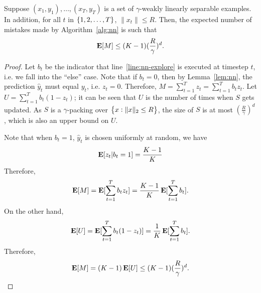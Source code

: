 \begin{theorem}
\label{thm:margin_at_upper}
Suppose $(x_1,y_1), \ldots, (x_T, y_T)$ is a set of $\gamma$-weakly linearly
separable examples. In addition, for all $t$ in $\cbr{1,2,\dots,T}$, $\| x_t \|
\leq R$. Then, the expected number of mistakes made by Algorithm~\ref{alg:nn} is
such that \[\operatorname*{\mathbf{E}}[M] \le (K-1) (\frac R \gamma)^d. \]
\end{theorem}

\begin{proof}
Let $b_t$ be the indicator that line~\ref{line:nn-explore} is executed at
timestep $t$, i.e. we fall into the ``else'' case. Note that if $b_t = 0$, then
by Lemma~\ref{lem:nn}, the prediction $\hat{y}_t$ must equal $y_t$, i.e. $z_t =
0$. Therefore, $M = \sum_{t=1}^T z_t = \sum_{t=1}^T b_t z_t$. Let $U =
\sum_{t=1}^T b_t (1-z_t)$; it can be seen that $U$ is the number of times when
$S$ gets updated. As $S$ is a $\gamma$-packing over $\cbr{x: \|x\|_2 \leq R}$,
the size of $S$ is at most $(\frac R \gamma)^d$, which is also an upper bound on
$U$.

Note that when $b_t = 1$, $\hat{y}_t$ is chosen uniformly at random, we have
\[ \operatorname*{\mathbf{E}}[ z_t | b_t = 1] = \frac{K-1}{K} \]
Therefore,
\[ \operatorname*{\mathbf{E}}[M] = \operatorname*{\mathbf{E}}[\sum_{t=1}^T b_t z_t] = \frac{K-1}{K} \operatorname*{\mathbf{E}}[\sum_{t=1}^T b_t]. \]
On the other hand,
\[ \operatorname*{\mathbf{E}}[U] = \operatorname*{\mathbf{E}}[\sum_{t=1}^T b_t (1-z_t)] = \frac 1 K \operatorname*{\mathbf{E}}[\sum_{t=1}^T b_t]. \]
Therefore,
\[ \operatorname*{\mathbf{E}}[M] = (K-1) \operatorname*{\mathbf{E}}[U] \leq (K-1) (\frac R \gamma)^d. \]
\end{proof}
